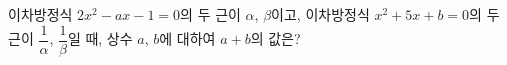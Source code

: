 이차방정식 $2x^2-ax-1=0$의 두 근이 $\alpha$, $\beta$이고, 이차방정식 $x^2+5x+b=0$의 두 근이 $\dfrac{1}{\alpha}$, $\dfrac{1}{\beta}$일 때, 상수 $a$, $b$에 대하여 $a+b$의 값은?
